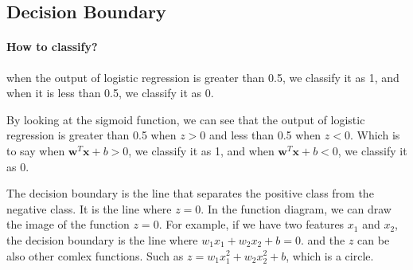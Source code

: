 \subsection{Decision Boundary}
\paragraph*{How to classify?}
when the output of logistic regression is greater than 0.5,
we classify it as 1, and when it is less than 0.5, we classify it as 0.\\
\par
\hspace{2em}By looking at the sigmoid function,
 we can see that the output of logistic regression is greater than 0.5 when $z > 0$ and less than 0.5 when $z < 0$.
Which is to say when $\mathbf{w}^T \mathbf{x} + b > 0$,
 we classify it as 1, and when $\mathbf{w}^T \mathbf{x} + b < 0$, we classify it as 0.\\

\begin{notebox}
    \hspace{2em}The decision boundary is the line that separates the positive class from the negative class.
    It is the line where $z=0$. In the function diagram, we can draw the image of the function $z=0$. For example,
    if we have two features $x_1$ and $x_2$, the decision boundary is the line where $w_1 x_1 + w_2 x_2 + b = 0$.
    and the $z$ can be also other comlex functions. Such as $z = w_1 x_1^2 + w_2 x_2^2 + b$, which is a circle.
\end{notebox}

